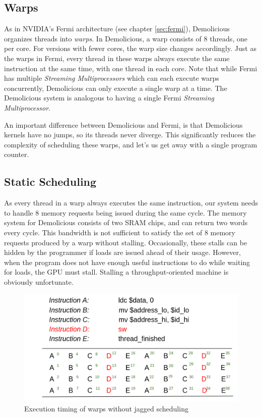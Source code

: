 \documentclass[../main/report.tex]{subfiles}
\begin{document}
\subsection{Warps}

As in NVIDIA's Fermi architecture (see chapter \ref{sec:fermi}), Demolicious organizes threads into \emph{warps}.
In Demolicious, a warp consists of 8 threads, one per core. 
For versions with fewer cores, the warp size changes accordingly.
Just as the warps in Fermi, every thread in these warps always execute the same instruction at the same time, with one thread in each core.
Note that while Fermi has multiple \emph{Streaming Multiprocessors} which can each execute warps concurrently, Demolicious can only execute a single warp at a time.
The Demolicious system is analogous to having a single Fermi \emph{Streaming Multiprocessor}.

An important difference between Demolicious and Fermi, is that Demolicious kernels have no jumps, so its threads never diverge.
This significantly reduces the complexity of scheduling these warps, and let's us get away with a single program counter.

\subsection{Static Scheduling}

As every thread in a warp always executes the same instruction, our system needs to handle 8 memory requests being issued during the same cycle.
The memory system for Demolicious consists of two SRAM chips, and can return two words every cycle.
This bandwidth is not sufficient to satisfy the set of 8 memory requests produced by a warp without stalling.
Occasionally, these stalls can be hidden by the programmer if loads are issued ahead of their usage.
However, when the program does not have enough useful instructions to do while waiting for loads, the GPU must stall.
Stalling a throughput-oriented machine is obviously unfortunate.

\begin{figure}[htp]
\centering
\includegraphics[scale=0.25]{../gpu/diagrams/uten_jaktstart_num.png}
\caption{Execution timing of warps without jagged scheduling}
\label{nojagged}
\end{figure}
\end{document}
